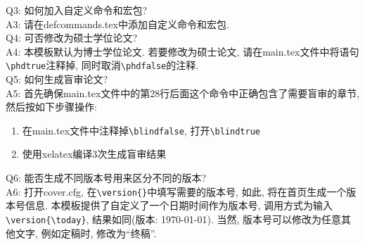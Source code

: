 Q3: 如何加入自定义命令和宏包?\\
A3: 请在defcommands.tex中添加自定义命令和宏包.\\

Q4: 可否修改为硕士学位论文?\\
A4: 本模板默认为博士学位论文. 若要修改为硕士论文, 请在main.tex文件中将语句\verb|\phdtrue|注释掉, 同时取消\verb|\phdfalse|的注释. \\

Q5: 如何生成盲审论文?\\
A5: 首先确保main.tex文件中的第28行后面这个\verb||命令中正确包含了需要盲审的章节, 然后按如下步骤操作:
\begin{enumerate}
\item 在main.tex文件中注释掉\verb|\blindfalse|, 打开\verb|\blindtrue|
\item 使用xelatex编译3次生成盲审结果
\end{enumerate}

Q6: 能否生成不同版本号用来区分不同的版本?\\
A6: 打开cover.cfg, 在\verb|\version{}|中填写需要的版本号, 如此, 将在首页生成一个版本号信息. 本模板提供了自定义了一个日期时间作为版本号, 调用方式为输入\verb|\version{\today}|, 结果如同(版本: \today). 当然, 版本号可以修改为任意其他文字, 例如定稿时, 修改为``终稿''.
